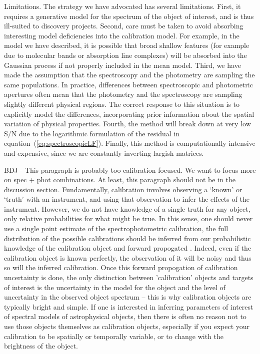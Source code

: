 \documentclass[iop,numberedappendix]{emulateapj}
\begin{document}
Limitations.  The strategy we have advocated has several limitations.
First, it requires a generative model for the spectrum of the object
of interest, and is thus ill-suited to discovery projects.  Second,
care must be taken to avoid absorbing interesting model deficiencies
into the calibration model. For example, in the model we have
described, it is possible that broad shallow features (for example due
to molecular bands or absorption line complexes) will be absorbed into
the Gaussian process if not properly included in the mean
model. Third, we have made the assumption that the spectroscopy and
the photometry are sampling the same populations.  In practice,
differences between spectroscopic and photometric apertures often mean
that the photometry and the spectroscopy are sampling slightly
different physical regions.  The correct response to this situation is
to explicitly model the differences, incorporating prior information
about the spatial variation of physical properties.  Fourth, the
method will break down at very low S/N due to the logarithmic
formulation of the residual in equation~(\ref{eq:spectroscopicLF}).
Finally, this method is computationally intensive and expensive, since
we are constantly inverting largish matrices.

{\color{blue} BDJ - This paragraph is probably too calibration
focused. We want to focus more on spec + phot combinations.  At least,
this paragraph should not be in the discussion section.}
Fundamentally, calibration involves observing a `known' or `truth'
with an instrument, and using that observation to infer the effects of
the instrument.  However, we do not have knowledge of a single truth
for any object, only relative probabilities for what might be true.
In this sense, one should never use a single point estimate of the
spectrophotometric calibration, the full distribution of the possible
calibrations should be inferred from our probabilistic knowledge of
the calibration object and forward propogated
\citep[e.g.][]{lee11}. Indeed, even if the calibration object is known
perfectly, the observation of it will be noisy and thus so will the
inferred calibration. Once this forward propogation of calibration
uncertainty is done, the only distinction between 'calibration'
objects and targets of interest is the uncertainty in the model for
the object and the level of uncertainty in the observed object
spectrum -- this is why calibration objects are typically bright and
simple.  If one is interested in inferring parameters of interest of
spectral models of astrophysical objects, then there is often no
reason not to use those objects themselves as calibration objects,
especially if you expect your calibration to be spatially or 
temporally variable, or to change with the brightness of the object.
\end{document}
